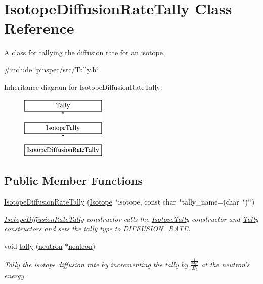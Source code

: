 \hypertarget{classIsotopeDiffusionRateTally}{\section{Isotope\-Diffusion\-Rate\-Tally Class Reference}
\label{classIsotopeDiffusionRateTally}
}


A class for tallying the diffusion rate for an isotope.  




{\ttfamily \#include \char`\"{}pinspec/src/\-Tally.\-h\char`\"{}}

Inheritance diagram for Isotope\-Diffusion\-Rate\-Tally\-:\begin{figure}[H]
\begin{center}
\leavevmode
\includegraphics[height=3.000000cm]{classIsotopeDiffusionRateTally}
\end{center}
\end{figure}
\subsection*{Public Member Functions}
\begin{DoxyCompactItemize}
\item 
\hyperlink{classIsotopeDiffusionRateTally_af7261cada71cb0cea0a6f3f4d5b92f4c}{Isotope\-Diffusion\-Rate\-Tally} (\hyperlink{classIsotope}{Isotope} $\ast$isotope, const char $\ast$tally\-\_\-name=(char $\ast$)\char`\"{}\char`\"{})
\begin{DoxyCompactList}\small\item\em \hyperlink{classIsotopeDiffusionRateTally}{Isotope\-Diffusion\-Rate\-Tally} constructor calls the \hyperlink{classIsotopeTally}{Isotope\-Tally} constructor and \hyperlink{classTally}{Tally} constructors and sets the tally type to D\-I\-F\-F\-U\-S\-I\-O\-N\-\_\-\-R\-A\-T\-E. \end{DoxyCompactList}\item 
void \hyperlink{classIsotopeDiffusionRateTally_af9de72dec40388388faba7fdf13ec5a4}{tally} (\hyperlink{structneutron}{neutron} $\ast$\hyperlink{structneutron}{neutron})
\begin{DoxyCompactList}\small\item\em \hyperlink{classTally}{Tally} the isotope diffusion rate by incrementing the tally by $ \frac{\frac{1}{3\sigma_tr}}{\Sigma_t} $ at the neutron's energy. \end{DoxyCompactList}\end{DoxyCompactItemize}
